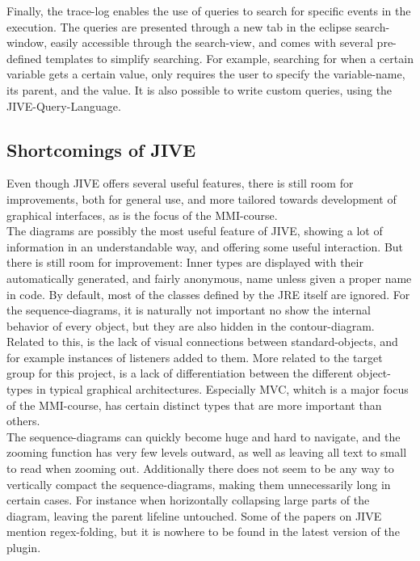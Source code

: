 Finally, the trace-log enables the use of queries to search for specific events in the execution.
The queries are presented through a new tab in the eclipse search-window, easily accessible through the search-view, and comes with several pre-defined templates to simplify searching.
For example, searching for when a certain variable gets a certain value, only requires the user to specify the variable-name, its parent, and the value.
It is also possible to write custom queries, using the JIVE-Query-Language.
~\\

\subsection{Shortcomings of JIVE}\label{jiveShortcomings}

Even though JIVE offers several useful features, there is still room for improvements, both for general use, and more tailored towards development of graphical interfaces, as is the focus of the MMI-course.
~\\

The diagrams are possibly the most useful feature of JIVE, showing a lot of information in an understandable way, and offering some useful interaction.
But there is still room for improvement:
Inner types are displayed with their automatically generated, and fairly anonymous, name unless given a proper name in code.
By default, most of the classes defined by the JRE itself are ignored.
For the sequence-diagrams, it is naturally not important no show the internal behavior of every object, but they are also hidden in the contour-diagram.
Related to this, is the lack of visual connections between standard-objects, and for example instances of listeners added to them.
More related to the target group for this project, is a lack of differentiation between the different object-types in typical graphical architectures.
Especially MVC, whitch  is a major focus of the MMI-course, has certain distinct types that are more important than others.
~\\

The sequence-diagrams can quickly become huge and hard to navigate, and the zooming function has very few levels outward, as well as leaving all text to small to read when zooming out.
Additionally there does not seem to be any way to vertically compact the sequence-diagrams, making them unnecessarily long in certain cases.
For instance when horizontally collapsing large parts of the diagram, leaving the parent lifeline untouched.
Some of the papers on JIVE mention regex-folding, but it is nowhere to be found in the latest version of the plugin.
~\\

